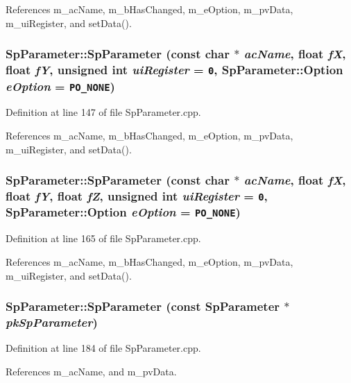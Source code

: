 References m\_\-ac\-Name, m\_\-b\-Has\-Changed, m\_\-e\-Option, m\_\-pv\-Data, m\_\-ui\-Register, and set\-Data().
\subsubsection{\setlength{\rightskip}{0pt plus 5cm}Sp\-Parameter::Sp\-Parameter (const char $\ast$ {\em ac\-Name}, float {\em f\-X}, float {\em f\-Y}, unsigned int {\em ui\-Register} = {\tt 0}, {\bf Sp\-Parameter::Option} {\em e\-Option} = {\tt PO\_\-NONE})}\label{classSpark_1_1SpParameter_a8}


Definition at line 147 of file Sp\-Parameter.cpp.

References m\_\-ac\-Name, m\_\-b\-Has\-Changed, m\_\-e\-Option, m\_\-pv\-Data, m\_\-ui\-Register, and set\-Data().
\subsubsection{\setlength{\rightskip}{0pt plus 5cm}Sp\-Parameter::Sp\-Parameter (const char $\ast$ {\em ac\-Name}, float {\em f\-X}, float {\em f\-Y}, float {\em f\-Z}, unsigned int {\em ui\-Register} = {\tt 0}, {\bf Sp\-Parameter::Option} {\em e\-Option} = {\tt PO\_\-NONE})}\label{classSpark_1_1SpParameter_a9}


Definition at line 165 of file Sp\-Parameter.cpp.

References m\_\-ac\-Name, m\_\-b\-Has\-Changed, m\_\-e\-Option, m\_\-pv\-Data, m\_\-ui\-Register, and set\-Data().
\subsubsection{\setlength{\rightskip}{0pt plus 5cm}Sp\-Parameter::Sp\-Parameter (const {\bf Sp\-Parameter} $\ast$ {\em pk\-Sp\-Parameter})}\label{classSpark_1_1SpParameter_a10}


Definition at line 184 of file Sp\-Parameter.cpp.

References m\_\-ac\-Name, and m\_\-pv\-Data.
